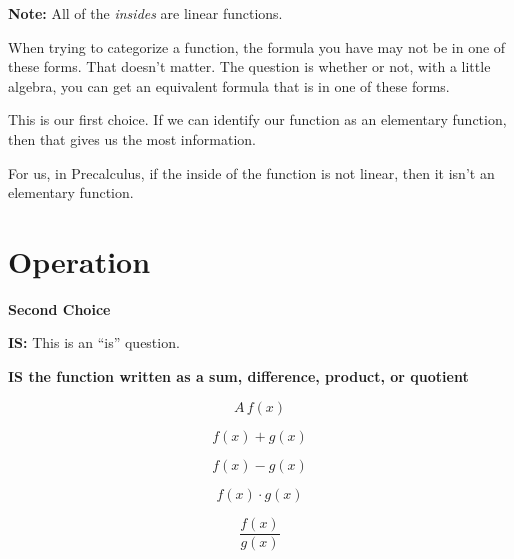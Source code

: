 \documentclass{ximera}
\begin{document}
\textbf{Note:} All of the \textit{insides} are linear functions. 


When trying to categorize a function, the formula you have may not be in one of these forms.  That doesn't matter.  The question is whether or not, with a little algebra, you can get an equivalent formula that is in one of these forms. 


This is our first choice.  If we can identify our function as an elementary function, then that gives us the most information. 


For us, in Precalculus, if the inside of the function is not linear, then it isn't an elementary function. 







































\section*{Operation}

\textbf{\textcolor{purple!85!blue}{Second Choice}} 


\textbf{\textcolor{purple!70!blue}{IS:}}   This is an ``is'' question. 

\begin{center}
\textbf{\textcolor{red!80!black}{IS the function written as a sum, difference, product, or quotient}}

\end{center}




\[
A \, f(x) 
\]


\[
f(x) + g(x)
\]


\[
f(x) - g(x)
\]


\[
f(x) \cdot g(x)
\]


\[
\frac{f(x)}{g(x)}
\]
\end{document}
